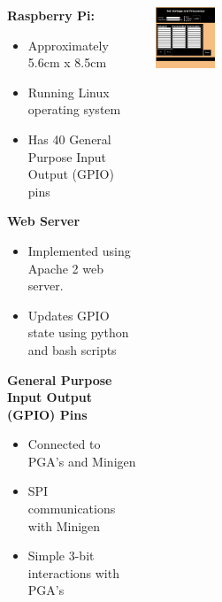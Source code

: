 \documentclass[25pt, a0paper, portrait, margin=0mm, innermargin=15mm, blockverticalspace=15mm, colspace=15mm, subcolspace=8mm]{tikzposter}
\begin{document}
\begin{columns}
{\begin{multicols}{2}
\textbf{Raspberry Pi:}
\begin{itemize}
\item Approximately 5.6cm x 8.5cm
\item Running Linux operating system
\item Has 40 General Purpose Input Output (GPIO) pins
\end{itemize}

\textbf{Web Server}
\begin{itemize}
\item Implemented using Apache 2 web server.
\item Updates GPIO state using python and bash scripts
\end{itemize}

\textbf{General Purpose Input Output (GPIO) Pins}
\begin{itemize}
\item Connected to PGA's and Minigen
\item SPI communications with Minigen
\item Simple 3-bit interactions with PGA's
\end{itemize}



\end{multicols}
}

{
\begin{multicols}{2}


\begin{center}
\includegraphics[width=0.2\textwidth,keepaspectratio]{491_web_interface_good.png}
\end{center}


\end{multicols}}
\end{columns}
\end{document}
